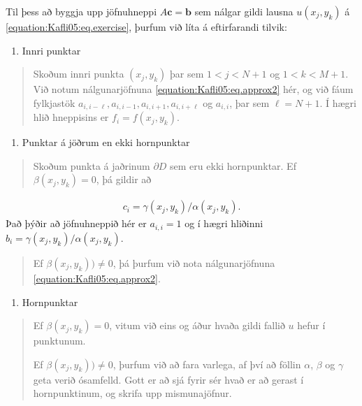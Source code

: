 \documentclass[a4paper,10pt,icelandic]{sphinxmanual}
\begin{document}
Til þess að byggja upp jöfnuhneppi \(A{\mathbf c}={\mathbf b}\) sem nálgar gildi lausna \(u(x_j,y_k)\) á \eqref{equation:Kafli05:eq.exercise}, þurfum við líta á eftirfarandi tilvik:
\begin{enumerate}
\def\theenumi{\arabic{enumi}}
\def\labelenumi{\theenumi .}
\makeatletter\def\p@enumii{\p@enumi \theenumi .}\makeatother
\item {} 
Innri punktar

\end{enumerate}
\begin{quote}

Skoðum innri punkta \((x_j,y_k)\)  þar sem \(1<j<N+1\) og \(1<k<M+1\). Við notum nálgunarjöfnuna \eqref{equation:Kafli05:eq.approx2} hér, og við fáum fylkjastök \(a_{i,i-\ell}, a_{i,i-1}, a_{i,i+1}, a_{i,i+\ell}\) og \(a_{i,i}\), þar sem \(\ell=N+1\). Í hægri hlið hneppisins er \(f_i=f(x_j,y_k)\).
\end{quote}
\begin{enumerate}
\def\theenumi{\arabic{enumi}}
\def\labelenumi{\theenumi .}
\makeatletter\def\p@enumii{\p@enumi \theenumi .}\makeatother
\setcounter{enumi}{1}
\item {} 
Punktar á jöðrum en ekki hornpunktar

\end{enumerate}
\begin{quote}

Skoðum punkta á jaðrinum \(\partial D\) sem eru ekki hornpunktar. Ef \(\beta(x_j, y_k)=0\), þá gildir að
\end{quote}
\begin{equation*}
\begin{split}c_i=\gamma(x_j,y_k)/\alpha(x_j,y_k).\end{split}
\end{equation*}
Það þýðir að jöfnuhneppið hér er \(a_{i,i}=1\) og í hægri hliðinni \(b_i=\gamma(x_j,y_k)/\alpha(x_j,y_k)\).
\begin{quote}

Ef \(\beta(x_j,y_k))\neq 0\), þá þurfum við nota  nálgunarjöfnuna \eqref{equation:Kafli05:eq.approx2}.
\end{quote}
\begin{enumerate}
\def\theenumi{\arabic{enumi}}
\def\labelenumi{\theenumi .}
\makeatletter\def\p@enumii{\p@enumi \theenumi .}\makeatother
\setcounter{enumi}{2}
\item {} 
Hornpunktar

\end{enumerate}
\begin{quote}

Ef \(\beta(x_j, y_k)=0\),  vitum við eins og áður hvaða gildi fallið \(u\) hefur í punktunum.

Ef \(\beta(x_j,y_k))\neq 0\), þurfum við að fara varlega, af því að föllin \(\alpha\), \(\beta\) og \(\gamma\) geta verið ósamfelld. Gott er að sjá fyrir sér hvað er að gerast í hornpunktinum, og skrifa upp mismunajöfnur.
\end{quote}
\end{document}
